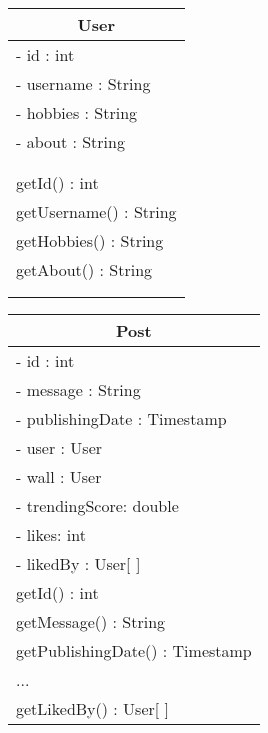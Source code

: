 \documentclass[parskip=half*]{scrartcl}
\begin{document}
\begin{figure}[htb]
    \centering
    \begin{tabular}[t]{|l|}
    \hline
    \multicolumn{1}{|c|}{\bfseries User} \\ \hline
     - id : int  \\
     - username : String  \\
     - hobbies : String  \\
     - about : String  \\  \\ \\ \hline
     getId() : int  \\
     getUsername() : String  \\
     getHobbies() : String  \\
     getAbout() : String  \\  \\ \\ \hline
    \end{tabular}
    \hspace{0.8cm}
    \begin{tabular}[t]{|l|}
    \hline
    \multicolumn{1}{|c|}{\bfseries Post} \\ \hline
     - id : int  \\
     - message : String \\
     - publishingDate : Timestamp  \\
     - user : User  \\
     - wall : User  \\
     - trendingScore: double \\
     - likes: int \\
     - likedBy : User[ ]  \\ \hline
     getId() : int  \\
     getMessage() : String  \\
     getPublishingDate() : Timestamp  \\
     ... \\
     getLikedBy() : User[ ] \\ \hline
    \end{tabular}
    \label{fig:klasse_User_Post}
\end{figure}
\end{document}
